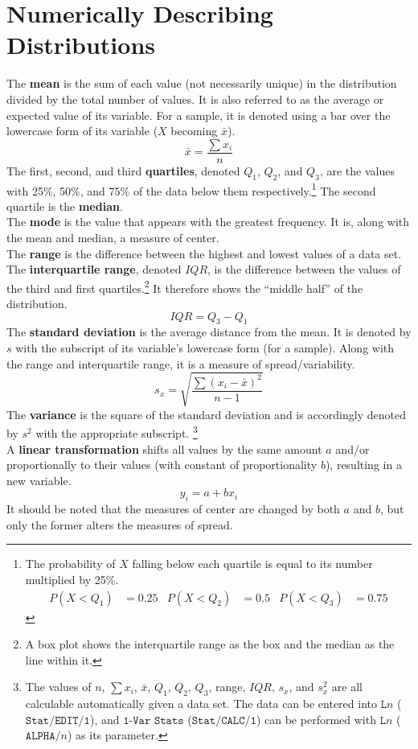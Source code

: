 \documentclass[../AP_Statistics.tex]{subfiles}
\begin{document}
		\section{Numerically Describing Distributions}
			The \textbf{mean} is the sum of each value (not necessarily unique) in the distribution divided by the total number of values. It is also referred to as the average or expected value of its variable. For a sample, it is denoted using a bar over the lowercase form of its variable ($X$ becoming $\bar{x}$).
			\[\bar{x} = \frac{\sum x_i}{n}\]
			The first, second, and third \textbf{quartiles}, denoted $Q_1$, $Q_2$, and $Q_3$, are the values with 25\%, 50\%, and 75\% of the data below them respectively.\footnote{The probability of $X$ falling below each quartile is equal to its number multiplied by 25\%. \begin{align*} P(X < Q_1) &= 0.25 & P(X < Q_2) &= 0.5 & P(X < Q_3) &= 0.75\end{align*}} The second quartile is the \textbf{median}. \\
			The \textbf{mode} is the value that appears with the greatest frequency. It is, along with the mean and median, a measure of center. \\
			The \textbf{range} is the difference between the highest and lowest values of a data set. \\
			The \textbf{interquartile range}, denoted $IQR$, is the difference between the values of the third and first quartiles.\footnote{A box plot shows the interquartile range as the box and the median as the line within it.} It therefore shows the \enquote{middle half} of the distribution.
			\[IQR = Q_3 - Q_1\]
			The \textbf{standard deviation} is the average distance from the mean. It is denoted by $s$  with the subscript of its variable's lowercase form (for a sample). Along with the range and interquartile range, it is a measure of spread/variability.
			\[s_x = \sqrt{\frac{\sum (x_i - \bar{x})^2}{n - 1}}\]
			The \textbf{variance} is the square of the standard deviation and is accordingly denoted by $s^2$ with the appropriate subscript. \footnote{The values of $n$, $\sum x_i$, $\bar{x}$, $Q_1$, $Q_2$, $Q_3$,  range, $IQR$, $s_x$, and $s_x^2$ are all calculable automatically given a data set. The data can be entered into $\texttt{L}n$ ($\texttt{Stat/EDIT/1}$), and $\texttt{1-Var Stats}$ ($\texttt{Stat/CALC/1}$) can be performed with $\texttt{L}n$ ($\texttt{ALPHA/}n$) as its parameter.} \\
			A \textbf{linear transformation} shifts all values by the same amount $a$ and/or proportionally to their values (with constant of proportionality $b$), resulting in a new variable. 
			\[y_i = a + bx_i\]
			It should be noted that the measures of center are changed by both $a$ and $b$, but only the former alters the measures of spread.
\end{document}
